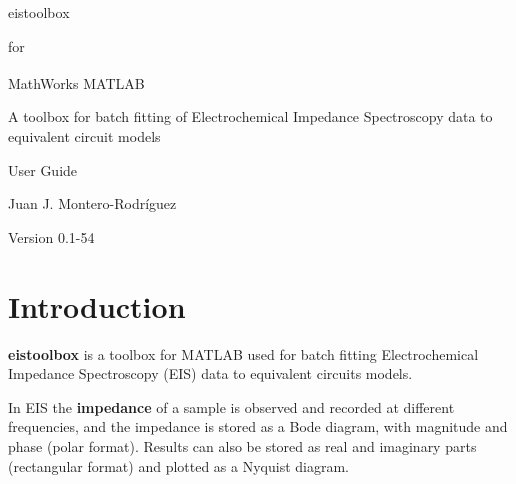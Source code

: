 \documentclass[10pt,a4paper,oneside]{book}
\begin{document}
\setlength{\parindent}{0pt}
\setlength{\parskip}{6pt}

 \vspace*{3cm}
	
 \begin{center}
 	\Huge eistoolbox \par
 \end{center}
 \begin{center}
 	\LARGE for \par
 \end{center}
 \begin{center}
 	\Huge MathWorks\textsuperscript{\textregistered} MATLAB \par
 \end{center}
 
 \vspace*{2cm}
 
\begin{center}
	\Large A toolbox for batch fitting of Electrochemical Impedance Spectroscopy data to equivalent circuit models
\end{center} 
 
 \vspace*{2cm}
 
 \begin{center}
 	\Huge User Guide \par
 \end{center}
 \begin{center}
 	\LARGE Juan J. Montero-Rodríguez \par
 \end{center}
 
 \vspace*{4cm}
 
 \begin{center}
 	\Large Version 0.1-54
 \end{center}

\clearpage

\tableofcontents

\chapter{Introduction}

\textbf{eistoolbox} is a toolbox for MATLAB\textregistered{} used for batch fitting Electrochemical Impedance Spectroscopy (EIS) data to equivalent circuits models.

In EIS the \textbf{impedance} of a sample is observed and recorded at different frequencies, and the impedance is stored as a Bode diagram, with magnitude and phase (polar format). Results can also be stored as real and imaginary parts (rectangular format) and plotted as a Nyquist diagram.
\end{document}
